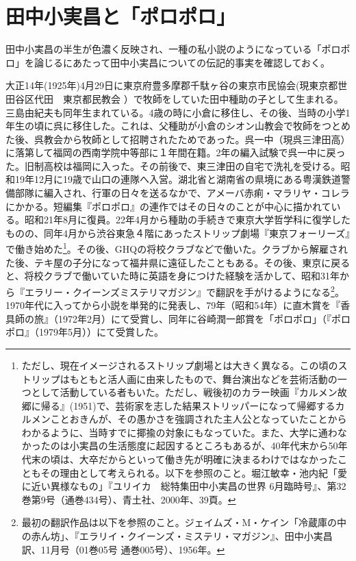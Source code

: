 \section{田中小実昌と「ポロポロ」}
田中小実昌の半生が色濃く反映され、一種の私小説のようになっている「ポロポロ」を論じるにあたって田中小実昌についての伝記的事実を確認しておく。

大正14年(1925年)4月29日に東京府豊多摩郡千駄ヶ谷の東京市民協会(現東京都世田谷区代田　東京都民教会 ）で牧師をしていた田中種助の子として生まれる。三島由紀夫も同年生まれている。4歳の時に小倉に移住し、その後、当時の小学1年生の頃に呉に移住した。これは、父種助が小倉のシオン山教会で牧師をつとめた後、呉教会から牧師として招聘されたためであった。呉一中（現呉三津田高）に落第して福岡の西南学院中等部に１年間在籍。2年の編入試験で呉一中に戻った。旧制高校は福岡に入った。その前後で、東三津田の自宅で洗礼を受ける。昭和19年12月に19歳で山口の連隊へ入営。湖北省と湖南省の県境にある粤漢鉄道警備部隊に編入され、行軍の日々を送るなかで、アメーバ赤痢・マラリヤ・コレラにかかる。短編集『ポロポロ』の連作ではその日々のことが中心に描かれている。昭和21年8月に復員。22年4月から種助の手続きで東京大学哲学科に復学したものの、同年4月から渋谷東急４階にあったストリップ劇場『東京フォーリーズ』で働き始めた\footnote{ただし、現在イメージされるストリップ劇場とは大きく異なる。この頃のストリップはもともと活人画に由来したもので、舞台演出などを芸術活動の一つとして活動している者もいた。ただし、戦後初のカラー映画『カルメン故郷に帰る』(1951)で、芸術家を志した結果ストリッパーになって帰郷するカルメンことおきんが、その愚かさを強調された主人公となっていたことからわかるように、当時すでに揶揄の対象にもなっていた。また、大学に通わなかったのは小実昌の生活態度に起因するところもあるが、40年代末から50年代末の頃は、大卒だからといって働き先が明確に決まるわけではなかったこともその理由として考えられる。以下を参照のこと。堀江敏幸・池内紀「愛に近い異様なもの」『ユリイカ　総特集田中小実昌の世界 6月臨時号』、第32巻第9号（通巻434号）、青土社、2000年、39頁。}。その後、GHQの将校クラブなどで働いた。クラブから解雇された後、テキ屋の子分になって福井県に遠征したこともある。その後、東京に戻ると、将校クラブで働いていた時に英語を身につけた経験を活かして、昭和31年から『エラリー・クイーンズミステリマガジン』で翻訳を手がけるようになる\footnote{最初の翻訳作品は以下を参照のこと。ジェイムズ・M・ケイン「冷蔵庫の中の赤ん坊」、『エラリイ・クイーンズ・ミステリ・マガジン』、田中小実昌訳、11月号（01巻05号 通巻005号）、1956年。}。1970年代に入ってから小説を単発的に発表し、79年（昭和54年）に直木賞を『香具師の旅』（1972年2月）にて受賞し、同年に谷崎潤一郎賞を「ポロポロ」（『ポロポロ』（1979年5月））にて受賞した。

